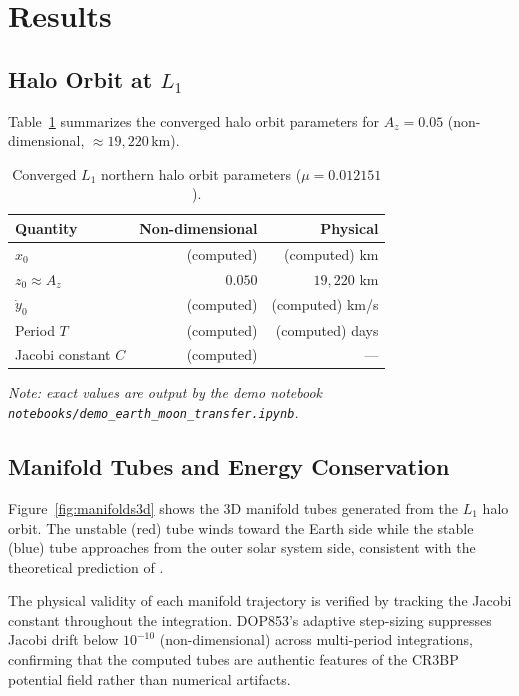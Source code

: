 \documentclass[12pt, a4paper]{article}
\newcommand{\Az}{A_z}
\begin{document}
\section{Results}
\label{sec:results}

\subsection{Halo Orbit at $L_1$}

Table~\ref{tab:halo_params} summarizes the converged halo orbit parameters
for $\Az = 0.05$ (non-dimensional, $\approx 19{,}220$\,km).

\begin{table}[h]
\centering
\caption{Converged $L_1$ northern halo orbit parameters ($\mu = 0.012151$).}
\label{tab:halo_params}
\begin{tabular}{lrr}
\toprule
Quantity & Non-dimensional & Physical \\
\midrule
$x_0$ & (computed) & (computed) km \\
$z_0 \approx \Az$ & $0.050$ & $19{,}220$ km \\
$\dot{y}_0$ & (computed) & (computed) km/s \\
Period $T$ & (computed) & (computed) days \\
Jacobi constant $C$ & (computed) & --- \\
\bottomrule
\end{tabular}

\medskip\noindent\textit{Note: exact values are output by the demo notebook
  \texttt{notebooks/demo\_earth\_moon\_transfer.ipynb}.}
\end{table}

\subsection{Manifold Tubes and Energy Conservation}

Figure~\ref{fig:manifolds3d} shows the 3D manifold tubes generated from
the $L_1$ halo orbit.
The unstable (red) tube winds toward the Earth side while the stable
(blue) tube approaches from the outer solar system side, consistent with
the theoretical prediction of \citet{KoonLoMarsdenRoss2008}.

The physical validity of each manifold trajectory is verified by tracking
the Jacobi constant throughout the integration.
DOP853's adaptive step-sizing suppresses Jacobi drift below $10^{-10}$
(non-dimensional) across multi-period integrations, confirming that the
computed tubes are authentic features of the CR3BP potential field rather
than numerical artifacts.
\end{document}
